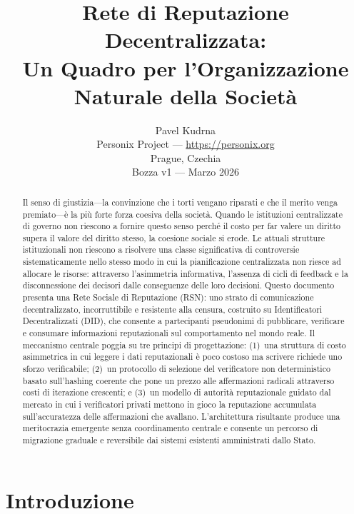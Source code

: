 \documentclass[11pt,a4paper,twocolumn]{article}
\title{\textbf{Rete di Reputazione Decentralizzata:\\Un Quadro per l'Organizzazione Naturale della Società}}
\author{Pavel Kudrna\\Personix Project --- \url{https://personix.org}\\Prague, Czechia\\Bozza v1 --- Marzo 2026}
\date{}
\begin{document}
\maketitle

\begin{abstract}
Il senso di giustizia---la convinzione che i torti vengano riparati e che il merito venga premiato---è la più forte forza coesiva della società. Quando le istituzioni centralizzate di governo non riescono a fornire questo senso perché il costo per far valere un diritto supera il valore del diritto stesso, la coesione sociale si erode. Le attuali strutture istituzionali non riescono a risolvere una classe significativa di controversie sistematicamente nello stesso modo in cui la pianificazione centralizzata non riesce ad allocare le risorse: attraverso l'asimmetria informativa, l'assenza di cicli di feedback e la disconnessione dei decisori dalle conseguenze delle loro decisioni. Questo documento presenta una Rete Sociale di Reputazione (RSN): uno strato di comunicazione decentralizzato, incorruttibile e resistente alla censura, costruito su Identificatori Decentralizzati (DID), che consente a partecipanti pseudonimi di pubblicare, verificare e consumare informazioni reputazionali sul comportamento nel mondo reale. Il meccanismo centrale poggia su tre principi di progettazione: (1)~una struttura di costo asimmetrica in cui leggere i dati reputazionali è poco costoso ma scrivere richiede uno sforzo verificabile; (2)~un protocollo di selezione del verificatore non deterministico basato sull'hashing coerente che pone un prezzo alle affermazioni radicali attraverso costi di iterazione crescenti; e (3)~un modello di autorità reputazionale guidato dal mercato in cui i verificatori privati mettono in gioco la reputazione accumulata sull'accuratezza delle affermazioni che avallano. L'architettura risultante produce una meritocrazia emergente senza coordinamento centrale e consente un percorso di migrazione graduale e reversibile dai sistemi esistenti amministrati dallo Stato.
\end{abstract}

\section{Introduzione}
\end{document}
